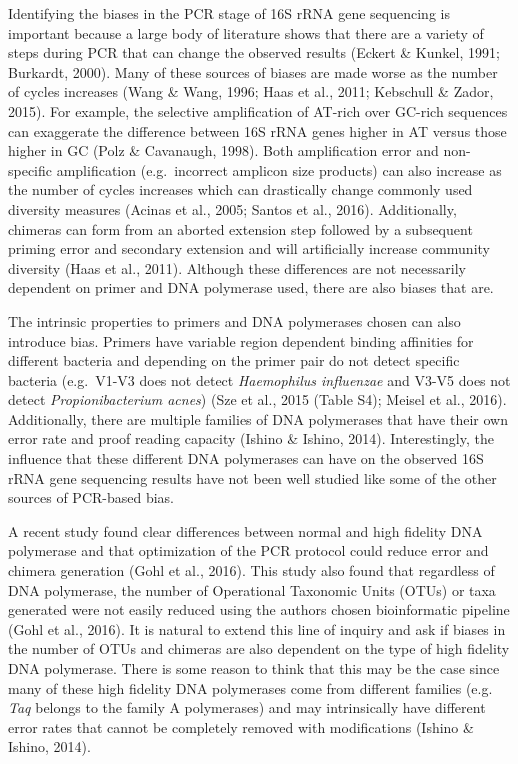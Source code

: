 \documentclass[12pt,]{article}
\begin{document}
Identifying the biases in the PCR stage of 16S rRNA gene sequencing is
important because a large body of literature shows that there are a
variety of steps during PCR that can change the observed results (Eckert
\& Kunkel, 1991; Burkardt, 2000). Many of these sources of biases are
made worse as the number of cycles increases (Wang \& Wang, 1996; Haas
et al., 2011; Kebschull \& Zador, 2015). For example, the selective
amplification of AT-rich over GC-rich sequences can exaggerate the
difference between 16S rRNA genes higher in AT versus those higher in GC
(Polz \& Cavanaugh, 1998). Both amplification error and non-specific
amplification (e.g.~incorrect amplicon size products) can also increase
as the number of cycles increases which can drastically change commonly
used diversity measures (Acinas et al., 2005; Santos et al., 2016).
Additionally, chimeras can form from an aborted extension step followed
by a subsequent priming error and secondary extension and will
artificially increase community diversity (Haas et al., 2011). Although
these differences are not necessarily dependent on primer and DNA
polymerase used, there are also biases that are.

The intrinsic properties to primers and DNA polymerases chosen can also
introduce bias. Primers have variable region dependent binding
affinities for different bacteria and depending on the primer pair do
not detect specific bacteria (e.g.~V1-V3 does not detect
\emph{Haemophilus influenzae} and V3-V5 does not detect
\emph{Propionibacterium acnes}) (Sze et al., 2015 (Table S4); Meisel et
al., 2016). Additionally, there are multiple families of DNA polymerases
that have their own error rate and proof reading capacity (Ishino \&
Ishino, 2014). Interestingly, the influence that these different DNA
polymerases can have on the observed 16S rRNA gene sequencing results
have not been well studied like some of the other sources of PCR-based
bias.

A recent study found clear differences between normal and high fidelity
DNA polymerase and that optimization of the PCR protocol could reduce
error and chimera generation (Gohl et al., 2016). This study also found
that regardless of DNA polymerase, the number of Operational Taxonomic
Units (OTUs) or taxa generated were not easily reduced using the authors
chosen bioinformatic pipeline (Gohl et al., 2016). It is natural to
extend this line of inquiry and ask if biases in the number of OTUs and
chimeras are also dependent on the type of high fidelity DNA polymerase.
There is some reason to think that this may be the case since many of
these high fidelity DNA polymerases come from different families (e.g.
\emph{Taq} belongs to the family A polymerases) and may intrinsically
have different error rates that cannot be completely removed with
modifications (Ishino \& Ishino, 2014).
\end{document}
